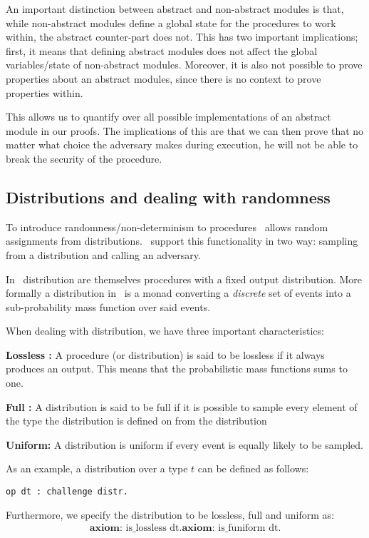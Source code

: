 An important distinction between abstract and non-abstract modules is that,
while non-abstract modules define a global state for the procedures to work
within, the abstract counter-part does not. This has two important implications;
first, it means that defining abstract modules does not affect the global
variables/state of non-abstract modules.
Moreover, it is also not possible to prove properties about an abstract modules, since
there is no context to prove properties within.

This allows us to quantify over all possible implementations of an abstract
module in our proofs.
The implications of this are that we can then prove that no matter what choice
the adversary makes during execution, he will not be able to break the security
of the procedure.

\subsection{Distributions and dealing with randomness}
\label{sec:easycrypt:distributions}
To introduce randomness/non-determinism to procedures \easycrypt\ allows
random assignments from distributions. \easycrypt\ support this functionality in
two way: sampling from a distribution and calling an adversary.

In \easycrypt\ distribution are themselves procedures with a fixed output
distribution. More formally a distribution in \easycrypt\ is a monad converting a
\textit{discrete} set of events into a sub-probability mass function over said events.

When dealing with distribution, we have three important characteristics:

\noindent \textbf{Lossless :} A procedure (or distribution) is said to be
lossless if it always produces an output. This means that the
probabilistic mass functions sums to one.

\noindent \textbf{Full :} A distribution is said to be full if it is
possible to sample every element of the type the distribution is defined on from
the distribution

\noindent \textbf{Uniform: } A distribution is uniform if every event is equally
likely to be sampled.

As an example, a distribution over a type $t$ can be defined as follows:
\begin{lstlisting}[frame=none]
op dt : challenge distr.
\end{lstlisting}
Furthermore, we specify the distribution to be lossless, full and uniform as:
\begin{gather*}
  \textbf{axiom: } \text{is\_lossless dt}.
  \textbf{axiom: } \text{is\_funiform dt}.
\end{gather*}

